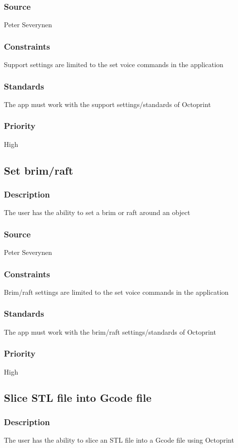\subsubsection{Source}
Peter Severynen
\subsubsection{Constraints}
Support settings are limited to the set voice commands in the application
\subsubsection{Standards}
The app must work with the support settings/standards of Octoprint
\subsubsection{Priority}
High
\subsection{Set brim/raft}
\subsubsection{Description}
The user has the ability to set a brim or raft around an object
\subsubsection{Source}
Peter Severynen
\subsubsection{Constraints}
Brim/raft settings are limited to the set voice commands in the application
\subsubsection{Standards}
The app must work with the brim/raft settings/standards of Octoprint
\subsubsection{Priority}
High
\subsection{Slice STL file into Gcode file}
\subsubsection{Description}
The user has the ability to slice an STL file into a Gcode file using Octoprint
